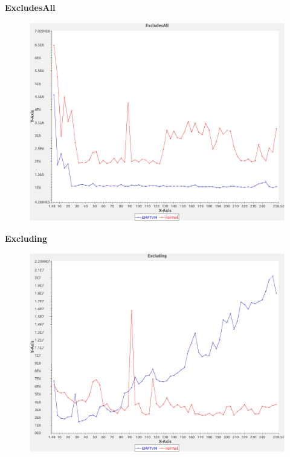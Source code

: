 \noindent\textbf{ExcludesAll}

\begin{figure}[h]
\centering
\includegraphics[width=\textwidth]{../graphs/sequence/ExcludesAll}
\end{figure}
\pagebreak

\noindent\textbf{Excluding}

\begin{figure}[h]
\centering
\includegraphics[width=\textwidth]{../graphs/sequence/Excluding}
\end{figure}
\pagebreak


